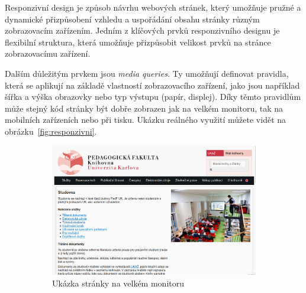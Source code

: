 \documentclass{csbulletin}
\begin{document}
Responzivní design je způsob návrhu webových stránek, který umožňuje
pružné a dynamické přizpůsobení vzhledu a uspořádání obsahu stránky
různým zobrazovacím zařízením. Jedním z klíčových prvků responzivního
designu je flexibilní struktura, která umožňuje přizpůsobit velikost
prvků na stránce zobrazovacímu zařízení.

Dalším důležitým prvkem jsou \textit{media queries}. 
Ty umožňují definovat
pravidla, která se aplikují na základě vlastností zobrazovacího
zařízení, jako jsou například šířka a výška obrazovky nebo typ výstupu (papír, displej). 
Díky těmto pravidlům může stejný kód stránky být dobře zobrazen jak na velkém
monitoru, tak na mobilních zařízeních nebo při tisku. Ukázku reálného využití 
můžete vidět na obrázku~\ref{fig:responzivni}.


\begin{figure}[tbp]
\begin{subfigure}[t]{0.74\textwidth}
    \includegraphics[width=\textwidth]{img/pedf-web-big.png}
    \caption{Ukázka stránky na velkém monitoru}
\end{subfigure}
\hfill
\begin{subfigure}[t]{0.24\textwidth}

\end{subfigure}
\end{figure}
\end{document}
